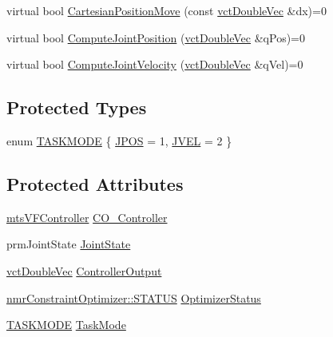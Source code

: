\begin{DoxyCompactItemize}
\item 
virtual bool \hyperlink{classmts_robot_task_a59dbc2c04bc10854230496843579010c}{Cartesian\+Position\+Move} (const \hyperlink{vct_dynamic_vector_types_8h_ade4b3068c86fb88f41af2e5187e491c2}{vct\+Double\+Vec} \&dx)=0
\item 
virtual bool \hyperlink{classmts_robot_task_a575b9ff835559ca9cb4ce6471e626548}{Compute\+Joint\+Position} (\hyperlink{vct_dynamic_vector_types_8h_ade4b3068c86fb88f41af2e5187e491c2}{vct\+Double\+Vec} \&q\+Pos)=0
\item 
virtual bool \hyperlink{classmts_robot_task_adbe66f085103b70f2aad4585753e72d1}{Compute\+Joint\+Velocity} (\hyperlink{vct_dynamic_vector_types_8h_ade4b3068c86fb88f41af2e5187e491c2}{vct\+Double\+Vec} \&q\+Vel)=0
\end{DoxyCompactItemize}
\subsection*{Protected Types}
\begin{DoxyCompactItemize}
\item 
enum \hyperlink{classmts_robot_task_a923d3233420024307a4c7cd85e011486}{T\+A\+S\+K\+M\+O\+D\+E} \{ \hyperlink{classmts_robot_task_a923d3233420024307a4c7cd85e011486a254870bb4f75421d28f48a18be4c4302}{J\+P\+O\+S} = 1, 
\hyperlink{classmts_robot_task_a923d3233420024307a4c7cd85e011486ab57992254d70c5470dd70451d7060500}{J\+V\+E\+L} = 2
 \}
\end{DoxyCompactItemize}
\subsection*{Protected Attributes}
\begin{DoxyCompactItemize}
\item 
\hyperlink{classmts_v_f_controller}{mts\+V\+F\+Controller} \hyperlink{classmts_robot_task_a1c15d44bb845e176fc619c12a32a92a0}{C\+O\+\_\+\+Controller}
\item 
prm\+Joint\+State \hyperlink{classmts_robot_task_a2c1bc0f905efde3109a0535e107013fc}{Joint\+State}
\item 
\hyperlink{vct_dynamic_vector_types_8h_ade4b3068c86fb88f41af2e5187e491c2}{vct\+Double\+Vec} \hyperlink{classmts_robot_task_aa263aa6c4baef69846e617cdca5cf91d}{Controller\+Output}
\item 
\hyperlink{classnmr_constraint_optimizer_ad46bf972892431d2c0a43a7099aec898}{nmr\+Constraint\+Optimizer\+::\+S\+T\+A\+T\+U\+S} \hyperlink{classmts_robot_task_a3066e11973ad9a8371c36b12a0df2fa0}{Optimizer\+Status}
\item 
\hyperlink{classmts_robot_task_a923d3233420024307a4c7cd85e011486}{T\+A\+S\+K\+M\+O\+D\+E} \hyperlink{classmts_robot_task_ac3cc9bd3a27954263574d01325a6439b}{Task\+Mode}
\end{DoxyCompactItemize}
